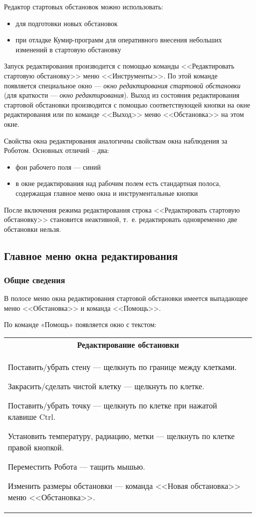 \documentclass[12pt,a4paper]{article}
\begin{document}
Редактор стартовых обстановок можно использовать:
\begin{itemize}
\item для подготовки новых обстановок
\item при отладке Кумир-программ для оперативного внесения небольших изменений в стартовую обстановку
\end{itemize}

Запуск редактирования производится с помощью команды <<Редактировать стартовую обстановку>> меню <<Инструменты>>. По этой команде появляется специальное окно --- \emph{окно редактирования стартовой обстановки} (для краткости --- \emph{окно редактирования}). Выход из состояния редактирования стартовой обстановки производится с помощью соответствующей кнопки на окне редактирования  или по команде <<Выход>> меню <<Обстановка>> на этом окне.

Свойства окна редактирования аналогичны свойствам окна наблюдения за Роботом. Основных отличий – два:
\begin{itemize}
\item фон рабочего поля --- синий
\item в окне редактирования над рабочим полем есть стандартная полоса, содержащая главное меню окна и инструментальные кнопки
\end{itemize}

После включения режима редактирования строка <<Редактировать стартовую обстановку>> становится неактивной, т.~е. редактировать одновременно две обстановки нельзя. 

\subsection{Главное меню окна редактирования}
\label{robotmainmenu}

\subsubsection{Общие сведения}

В полосе меню окна редактирования стартовой обстановки  имеется выпадающее меню <<Обстановка>> и команда <<Помощь>>.

По команде  «Помощь» появляется окно с текстом:
\begin{center}
\begin{tabular}{|p{16cm}|}
\hline
\multicolumn{1}{|c|}{\textbf{Редактирование обстановки}}\\

Поставить/убрать стену --- щелкнуть по границе между клетками.

Закрасить/сделать чистой клетку --- щелкнуть по клетке.

Поставить/убрать точку --- щелкнуть по клетке при нажатой клавише Ctrl.

Установить температуру, радиацию, метки --- щелкнуть по клетке правой кнопкой.

Переместить Робота --- тащить мышью.

Изменить размеры обстановки --- команда <<Новая обстановка>> меню <<Обстановка>>.\\
\hline
\end{tabular}
\end{center}
\end{document}
